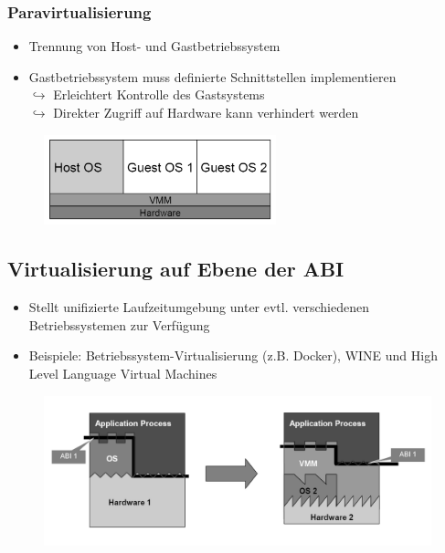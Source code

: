 \documentclass[a4paper,10pt]{scrreprt}
\begin{document}
	\subsubsection{Paravirtualisierung}
	\begin{itemize}
		\item Trennung von Host- und Gastbetriebssystem
		\item Gastbetriebssystem muss definierte Schnittstellen implementieren\\[5pt]
		$\hookrightarrow$ Erleichtert Kontrolle des Gastsystems\\[5pt]
		$\hookrightarrow$ Direkter Zugriff auf Hardware kann verhindert werden
	\end{itemize}
	\begin{figure}[ht]
		\centering
		\includegraphics[width=0.6\textwidth]{images/para}
	\end{figure}
	\subsection{Virtualisierung auf Ebene der ABI}
	\begin{itemize}
		\item Stellt unifizierte Laufzeitumgebung unter evtl. verschiedenen Betriebssystemen zur Verfügung
		\item Beispiele: Betriebssystem-Virtualisierung (z.B. Docker), WINE und High Level Language Virtual Machines
	\end{itemize}
	\begin{figure}[ht]
		\centering
		\includegraphics[width=1\textwidth]{images/v_abi}
	\end{figure}
\newpage
\end{document}
